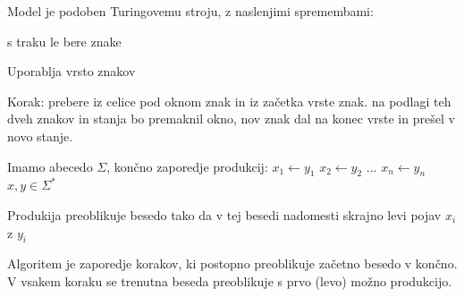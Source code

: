 \documentclass[10pt,a4paper,oneside]{book}
\begin{document}
Model je podoben Turingovemu stroju, z naslenjimi spremembami:
\begin{items}
\item s traku le bere znake
\item Uporablja vrsto znakov
\end{items}

Korak: prebere iz celice pod oknom znak in iz začetka vrste znak. na podlagi teh dveh znakov in stanja bo premaknil okno, nov znak dal na konec vrste in prešel v novo stanje.



Imamo abecedo $\Sigma$, končno zaporedje produkcij:
$x_1 \leftarrow y_1$
$x_2 \leftarrow y_2$
...
$x_n \leftarrow y_n$
$x,y \in \Sigma^*$%

Produkija preoblikuje besedo tako da v tej besedi nadomesti skrajno levi pojav $x_i$ z $y_i$ %

Algoritem je zaporedje korakov, ki postopno preoblikuje začetno besedo v končno. V vsakem koraku se trenutna beseda preoblikuje s prvo (levo) možno produkcijo.


\end{document}
